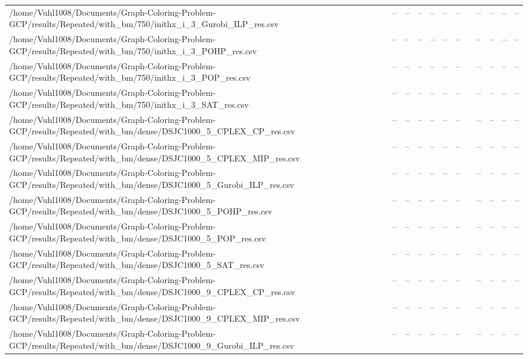 \begin{table}[htbp]
\begin{tabular}{llllllllllll}
/home/Vuhl1008/Documents/Graph-Coloring-Problem-GCP/results/Repeated/with\_bm/750/inithx\_i\_3\_Gurobi\_ILP\_res.csv & -- & -- & -- & -- & -- & -- & {} & -- & -- & -- & -- \\
/home/Vuhl1008/Documents/Graph-Coloring-Problem-GCP/results/Repeated/with\_bm/750/inithx\_i\_3\_POHP\_res.csv & -- & -- & -- & -- & -- & -- & {} & -- & -- & -- & -- \\
/home/Vuhl1008/Documents/Graph-Coloring-Problem-GCP/results/Repeated/with\_bm/750/inithx\_i\_3\_POP\_res.csv & -- & -- & -- & -- & -- & -- & {} & -- & -- & -- & -- \\
/home/Vuhl1008/Documents/Graph-Coloring-Problem-GCP/results/Repeated/with\_bm/750/inithx\_i\_3\_SAT\_res.csv & -- & -- & -- & -- & -- & -- & {} & -- & -- & -- & -- \\
/home/Vuhl1008/Documents/Graph-Coloring-Problem-GCP/results/Repeated/with\_bm/dense/DSJC1000\_5\_CPLEX\_CP\_res.csv & -- & -- & -- & -- & -- & -- & {} & -- & -- & -- & -- \\
/home/Vuhl1008/Documents/Graph-Coloring-Problem-GCP/results/Repeated/with\_bm/dense/DSJC1000\_5\_CPLEX\_MIP\_res.csv & -- & -- & -- & -- & -- & -- & {} & -- & -- & -- & -- \\
/home/Vuhl1008/Documents/Graph-Coloring-Problem-GCP/results/Repeated/with\_bm/dense/DSJC1000\_5\_Gurobi\_ILP\_res.csv & -- & -- & -- & -- & -- & -- & {} & -- & -- & -- & -- \\
/home/Vuhl1008/Documents/Graph-Coloring-Problem-GCP/results/Repeated/with\_bm/dense/DSJC1000\_5\_POHP\_res.csv & -- & -- & -- & -- & -- & -- & {} & -- & -- & -- & -- \\
/home/Vuhl1008/Documents/Graph-Coloring-Problem-GCP/results/Repeated/with\_bm/dense/DSJC1000\_5\_POP\_res.csv & -- & -- & -- & -- & -- & -- & {} & -- & -- & -- & -- \\
/home/Vuhl1008/Documents/Graph-Coloring-Problem-GCP/results/Repeated/with\_bm/dense/DSJC1000\_5\_SAT\_res.csv & -- & -- & -- & -- & -- & -- & {} & -- & -- & -- & -- \\
/home/Vuhl1008/Documents/Graph-Coloring-Problem-GCP/results/Repeated/with\_bm/dense/DSJC1000\_9\_CPLEX\_CP\_res.csv & -- & -- & -- & -- & -- & -- & {} & -- & -- & -- & -- \\
/home/Vuhl1008/Documents/Graph-Coloring-Problem-GCP/results/Repeated/with\_bm/dense/DSJC1000\_9\_CPLEX\_MIP\_res.csv & -- & -- & -- & -- & -- & -- & {} & -- & -- & -- & -- \\
/home/Vuhl1008/Documents/Graph-Coloring-Problem-GCP/results/Repeated/with\_bm/dense/DSJC1000\_9\_Gurobi\_ILP\_res.csv & -- & -- & -- & -- & -- & -- & {} & -- & -- & -- & -- \\

\end{tabular}
\end{table}
